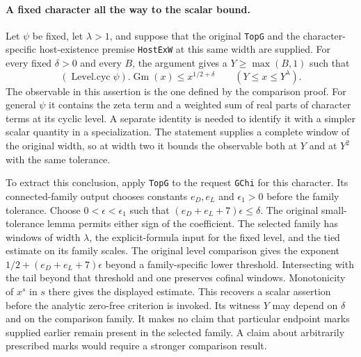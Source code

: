 \documentclass[12pt,letterpaper]{article}
\begin{document}
\paragraph{A fixed character all the way to the scalar bound.}
Let $\psi$ be fixed, let $\lambda>1$, and suppose that the original \texttt{TopG} and the character-specific host-existence premise \texttt{HostExW} at this same width are supplied. For every fixed $\delta>0$ and every $B$, the argument gives a $Y\geq \max(B,1)$ such that
\[
    (\operatorname{Level.cyc}\psi).\operatorname{Gm}(x)
       \leq x^{1/2+\delta}\qquad (Y\leq x\leq Y^{\lambda}).
\]
The observable in this assertion is the one defined by the comparison proof. For general $\psi$ it contains the zeta term and a weighted sum of real parts of character terms at its cyclic level. A separate identity is needed to identify it with a simpler scalar quantity in a specialization. The statement supplies a complete window of the original width, so at width two it bounds the observable both at $Y$ and at $Y^2$ with the same tolerance.

To extract this conclusion, apply \texttt{TopG} to the request \texttt{GChi} for this character. Its connected-family output chooses constants $e_D,e_L$ and $\epsilon_1>0$ before the family tolerance. Choose $0<\epsilon<\epsilon_1$ such that $(e_D+e_L+7)\epsilon\leq\delta$. The original small-tolerance lemma permits either sign of the coefficient. The selected family has windows of width $\lambda$, the explicit-formula input for the fixed level, and the tied estimate on its family scales. The original level comparison gives the exponent $1/2+(e_D+e_L+7)\epsilon$ beyond a family-specific lower threshold. Intersecting with the tail beyond that threshold and one preserves cofinal windows. Monotonicity of $x^s$ in $s$ there gives the displayed estimate. This recovers a scalar assertion before the analytic zero-free criterion is invoked. Its witness $Y$ may depend on $\delta$ and on the comparison family. It makes no claim that particular endpoint marks supplied earlier remain present in the selected family. A claim about arbitrarily prescribed marks would require a stronger comparison result.
\end{document}
